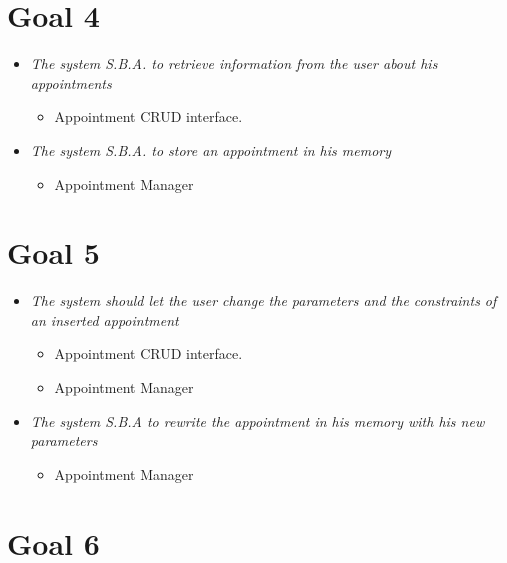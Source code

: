 \section{Goal 4}

\begin{itemize}

\item \textit{The system S.B.A. to retrieve information from the user about his appointments}

\begin{itemize}
\item Appointment CRUD interface.  
\end{itemize}

\item \textit{The system S.B.A. to store an appointment in his memory}

\begin{itemize}
\item Appointment Manager
\end{itemize}

\end{itemize}


\section{Goal 5}

\begin{itemize}

\item \textit{The system should let the user change the parameters and the constraints of an inserted appointment}

\begin{itemize}
\item Appointment CRUD interface.
\item Appointment Manager
\end{itemize}

\item \textit{The system S.B.A to rewrite the appointment in his memory with his new parameters}

\begin{itemize}
\item Appointment Manager
\end{itemize}

\end{itemize}


\section{Goal 6}

